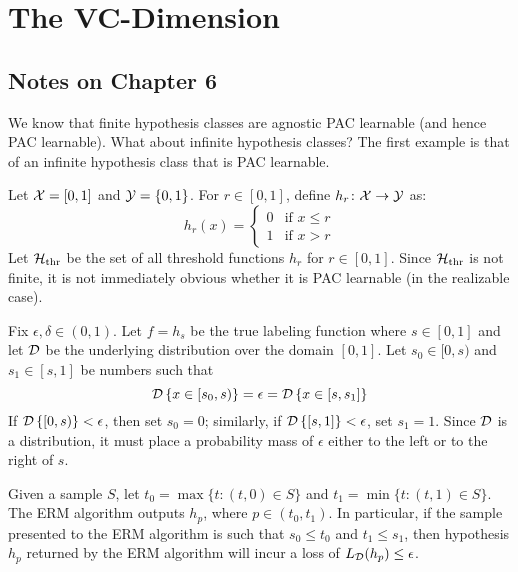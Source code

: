 \chapter{The VC-Dimension}

\section*{Notes on Chapter 6}

We know that finite hypothesis classes are agnostic PAC learnable (and hence
PAC learnable).  What about infinite hypothesis classes? The first example is 
that of an infinite hypothesis class that is PAC learnable. 

\begin{example}
Let $\mathcal{X} = [0, 1]$ and $\mathcal{Y} = \{0, 1\}$. For $r \in [0, 1]$, define 
$h_r \colon \mathcal{X} \rightarrow \mathcal{Y} $ as:
\[
    h_r(x) = \left \{ \begin{array}{ll} 
                        0 & \text{if } x \leq r \\
                        1 & \text{if } x > r
                      \end{array}\right .
\]
Let $\mathcal{H}_{\text{thr}}$ be the set of all threshold functions $h_r$ 
for $r \in [0, 1]$. Since $\mathcal{H}_{\text{thr}}$ is not finite, it is 
not immediately obvious whether it is PAC learnable (in the realizable case). 

Fix $\epsilon, \delta \in (0, 1)$. Let $f = h_s$ be the true labeling function
where $s \in [0, 1]$ and let $\mathcal{D}$ be the underlying distribution over the
domain $[0, 1]$. Let $s_0 \in [0, s)$ and $s_1 \in [s, 1]$ be numbers such that  
\[
    \mathcal{D} \left \{ x \in [s_0, s) \right \} = \epsilon =  
    \mathcal{D} \left \{ x \in [s, s_1] \right \}
\]
If $\mathcal{D} \left \{ [0, s) \right \} < \epsilon$, then set $s_0 = 0$; similarly, 
if $\mathcal{D} \left \{ [s, 1] \right \} < \epsilon$, set $s_1 = 1$. Since $\mathcal{D}$ 
is a distribution, it must place a probability mass of $\epsilon$ either to 
the left or to the right of $s$. 

Given a sample $S$, let $t_0 = \max \{t \colon (t, 0) \in S\}$ and $t_1 = \min
\{t \colon (t, 1) \in S\}$. The ERM algorithm outputs $h_p$, where $p \in (t_0,
t_1)$.  In particular, if the sample presented to the ERM algorithm is such
that $s_0 \leq t_0$ and $t_1 \leq s_1$, then hypothesis $h_p$ returned by the ERM
algorithm will incur a loss of $L_{\mathcal{D}}(h_p) \leq \epsilon$.


\end{example}
